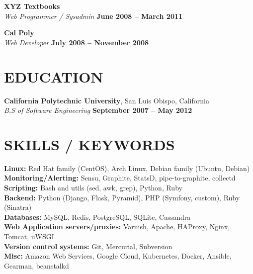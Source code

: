 \documentclass[margin,line]{resume}
\begin{document}
\begin{resume}
    \textbf{\listing XYZ Textbooks} \vspace{2mm}\\\vspace{1mm}%
    \textsl{Web Programmer / Sysadmin} \hfill \textbf{June 2008 -- March 2011}

    \textbf{\listing Cal Poly} \vspace{2mm}\\\vspace{1mm}%
    \textsl{Web Developer} \hfill \textbf{July 2008 -- November 2008}

\sectionline

    \section{\mysidestyle \textbf{\large{E}\small{DUCATION}}}

    \textbf{\listing California Polytechnic University}, San Luis Obispo, California \vspace{1mm}\\
    \textsl{B.S of Software Engineering} \hfill \textbf{September 2007 -- May 2012}\vspace{-3mm}\\\vspace{-1mm}%

\sectionline

    \section{\mysidestyle \textbf{\large{S}\small{KILLS} / \large{K}\small{EYWORDS}}}

    \textbf{Linux:} Red Hat family (CentOS), Arch Linux, Debian family (Ubuntu, Debian)\\
    \textbf{Monitoring/Alerting:} Sensu, Graphite, StatsD, pipe-to-graphite, collectd\\
    \textbf{Scripting:} Bash and utils (sed, awk, grep), Python, Ruby\\
    \textbf{Backend:} Python (Django, Flask, Pyramid), PHP (Symfony, custom), Ruby (Sinatra)\\
    \textbf{Databases:} MySQL, Redis, PostgreSQL, SQLite, Cassandra\\
    \textbf{Web Application servers/proxies:} Varnish, Apache, HAProxy, Nginx, Tomcat, uWSGI\\
    \textbf{Version control systems:} Git, Mercurial, Subversion\\
    \textbf{Misc:} Amazon Web Services, Google Cloud, Kubernetes, Docker, Ansible, Gearman, beanstalkd



\end{resume}
\end{document}
